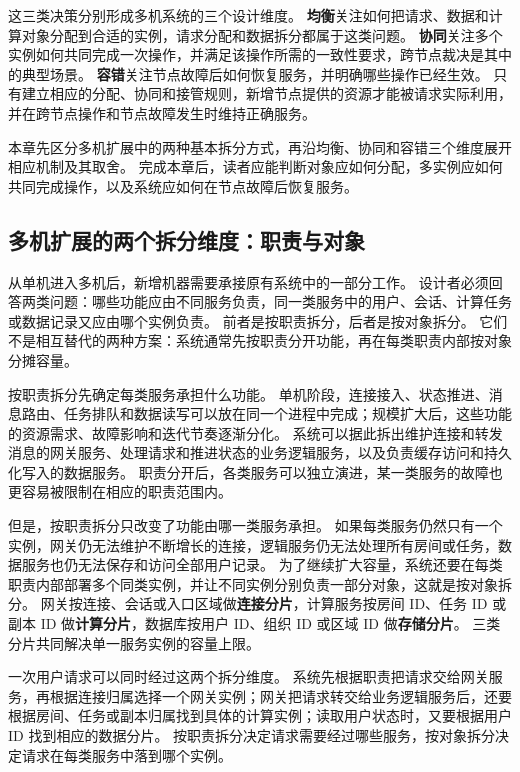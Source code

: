 这三类决策分别形成多机系统的三个设计维度。
\textbf{均衡}关注如何把请求、数据和计算对象分配到合适的实例，请求分配和数据拆分都属于这类问题。
\textbf{协同}关注多个实例如何共同完成一次操作，并满足该操作所需的一致性要求，跨节点裁决是其中的典型场景。
\textbf{容错}关注节点故障后如何恢复服务，并明确哪些操作已经生效。
只有建立相应的分配、协同和接管规则，新增节点提供的资源才能被请求实际利用，并在跨节点操作和节点故障发生时维持正确服务。

本章先区分多机扩展中的两种基本拆分方式，再沿均衡、协同和容错三个维度展开相应机制及其取舍。
完成本章后，读者应能判断对象应如何分配，多实例应如何共同完成操作，以及系统应如何在节点故障后恢复服务。

\subsection{多机扩展的两个拆分维度：职责与对象}\label{sec4:split-by-role-and-object}

从单机进入多机后，新增机器需要承接原有系统中的一部分工作。
设计者必须回答两类问题：哪些功能应由不同服务负责，同一类服务中的用户、会话、计算任务或数据记录又应由哪个实例负责。
前者是按职责拆分，后者是按对象拆分。
它们不是相互替代的两种方案：系统通常先按职责分开功能，再在每类职责内部按对象分摊容量。

按职责拆分先确定每类服务承担什么功能。
单机阶段，连接接入、状态推进、消息路由、任务排队和数据读写可以放在同一个进程中完成；规模扩大后，这些功能的资源需求、故障影响和迭代节奏逐渐分化。
系统可以据此拆出维护连接和转发消息的网关服务、处理请求和推进状态的业务逻辑服务，以及负责缓存访问和持久化写入的数据服务。
职责分开后，各类服务可以独立演进，某一类服务的故障也更容易被限制在相应的职责范围内。

但是，按职责拆分只改变了功能由哪一类服务承担。
如果每类服务仍然只有一个实例，网关仍无法维护不断增长的连接，逻辑服务仍无法处理所有房间或任务，数据服务也仍无法保存和访问全部用户记录。
为了继续扩大容量，系统还要在每类职责内部部署多个同类实例，并让不同实例分别负责一部分对象，这就是按对象拆分。
网关按连接、会话或入口区域做\textbf{连接分片}，计算服务按房间 ID、任务 ID 或副本 ID 做\textbf{计算分片}，数据库按用户 ID、组织 ID 或区域 ID 做\textbf{存储分片}。
三类分片共同解决单一服务实例的容量上限。

一次用户请求可以同时经过这两个拆分维度。
系统先根据职责把请求交给网关服务，再根据连接归属选择一个网关实例；网关把请求转交给业务逻辑服务后，还要根据房间、任务或副本归属找到具体的计算实例；读取用户状态时，又要根据用户 ID 找到相应的数据分片。
按职责拆分决定请求需要经过哪些服务，按对象拆分决定请求在每类服务中落到哪个实例。

